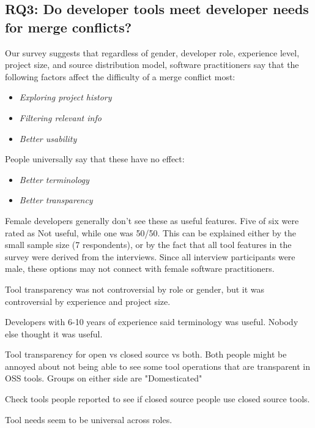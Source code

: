 \subsection{RQ3: Do developer tools meet developer needs for merge conflicts?}\label{RQ3}


Our survey suggests that regardless of gender, developer role, experience level, project size, and source distribution model, software practitioners say that the following factors affect the difficulty of a merge conflict most:

\begin{itemize}
	\item \textit{Exploring project history}\\
	\item \textit{Filtering relevant info}\\
	\item \textit{Better usability}\\
\end{itemize}

People universally say that these have no effect:
\begin{itemize}
	\item \textit{Better terminology}\\
	\item \textit{Better transparency}\\
\end{itemize}

Female developers generally don’t see these as useful features. Five of six were rated as Not useful, while one was 50/50. This can be explained either by the small sample size (7 respondents), or by the fact that all tool features in the survey were derived from the interviews. Since all interview participants were male, these options may not connect with female software practitioners.

Tool transparency was not controversial by role or gender, but it was controversial by experience and project size.

Developers with 6-10 years of experience said terminology was useful. Nobody else thought it was useful.

Tool transparency for open vs closed source vs both. Both people might be annoyed about not being able to see some tool operations that are transparent in OSS tools. Groups on either side are "Domesticated"

Check tools people reported to see if closed source people use closed source tools.

Tool needs seem to be universal across roles. 


%
%
%
%
